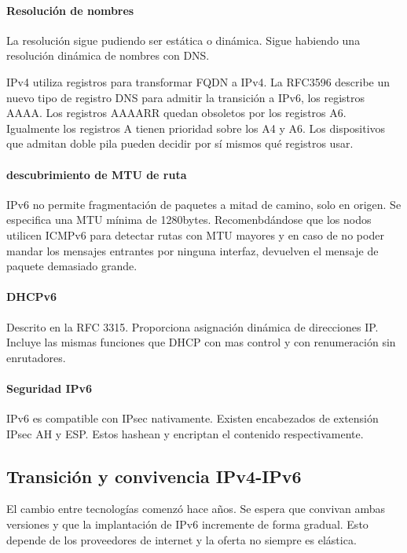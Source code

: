         \paragraph{Resolución de nombres}
            La resolución sigue pudiendo ser estática o dinámica. Sigue habiendo una resolución dinámica de nombres con DNS.

            IPv4 utiliza registros para transformar FQDN a IPv4. La RFC3596 describe un nuevo tipo de registro DNS para admitir la transición a IPv6, los registros AAAA. Los registros AAAARR quedan obsoletos por los registros A6. Igualmente los registros A tienen prioridad sobre los A4 y A6. Los dispositivos que admitan doble pila pueden decidir por sí mismos qué registros usar.

        \paragraph{descubrimiento de MTU de ruta}
            IPv6 no permite fragmentación de paquetes a mitad de camino, solo en origen. Se especifica una MTU mínima de 1280bytes. Recomenbdándose que los nodos utilicen ICMPv6 para detectar rutas con MTU mayores y en caso de no poder mandar los mensajes entrantes por ninguna interfaz, devuelven el mensaje de paquete demasiado grande.

        \paragraph{DHCPv6}
            Descrito en la RFC 3315. Proporciona asignación dinámica de direcciones IP. Incluye las mismas funciones que DHCP con mas control y con renumeración sin enrutadores.

        \paragraph{Seguridad IPv6}
            IPv6 es compatible con IPsec nativamente. Existen encabezados de extensión IPsec AH y ESP. Estos hashean y encriptan el contenido respectivamente.

\subsection{Transición y convivencia IPv4-IPv6} %
    El cambio entre tecnologías comenzó hace años. Se espera que convivan ambas versiones y que la implantación de IPv6 incremente de forma gradual. Esto depende de los proveedores de internet y la oferta no siempre es elástica.

